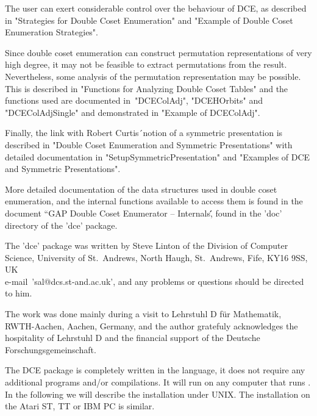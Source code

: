 The user  can exert considerable control  over  the behaviour  of DCE, as
described in "Strategies for  Double  Coset Enumeration" and "Example  of
Double Coset Enumeration Strategies".

Since double coset enumeration  can construct permutation representations
of very high degree, it may not be  feasible to extract permutations from
the result. Nevertheless, some analysis of the permutation representation
may  be possible.  This is described  in "Functions  for Analyzing Double
Coset Tables"  and the functions used  are documented  in\:\ "DCEColAdj",
"DCEHOrbits" and  "DCEColAdjSingle"   and  demonstrated in   "Example  of
DCEColAdj".

Finally,  the     link with Robert  Curtis\'\    notion   of a  symmetric
presentation  is described in   "Double  Coset Enumeration  and Symmetric
Presentations"          with         detailed       documentation      in
"SetupSymmetricPresentation"    and   "Examples  of  DCE   and  Symmetric
Presentations".

More detailed documentation of  the data structures  used in double coset
enumeration, and the internal functions available to access them is found
in the document ``GAP Double  Coset Enumerator -- Internals\'\', found in
the 'doc' directory of the 'dce' package.


The 'dce' package was written by Steve Linton of the Division of Computer
Science, University of St.~Andrews,  North Haugh, St.~Andrews, Fife, KY16
9SS, UK\\ e-mail\:\ 'sal@dcs.st-and.ac.uk', and any problems or questions
should be directed to him.

The work was done mainly during a visit  to Lehrstuhl D f\"ur Mathematik,
RWTH-Aachen, Aachen, Germany,  and the author gratefuly acknowledges  the
hospitality of Lehrstuhl  D and  the  financial support  of the  Deutsche
Forschungsgemeinschaft.


The DCE package is completely written in the {\GAP} language, it does not
require any additional programs and/or compilations.   It will run on any
computer that runs   {\GAP}.  In  the   following we  will describe   the
installation under UNIX. The installation  on the Atari ST,  TT or IBM PC
is similar.


